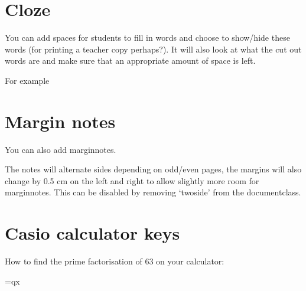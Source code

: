 \documentclass[11pt,a4paper,twoside]{report}
\begin{document}
\GridOn

\section{Cloze}

You can add spaces for students to fill in words and choose to show/hide these words (for printing a teacher copy perhaps?). It will also look at what the cut out words are and make sure that an appropriate amount of space is left.


For example 


\section{Margin notes}
You can also add marginnotes. 

The notes will alternate sides depending on odd/even pages, the margins will also change by 0.5 cm on the left and right to allow slightly more room for marginnotes. This can be disabled by removing `twoside' from the documentclass.

\section{Casio calculator keys}

How to find the prime factorisation of 63 on your calculator:
\begin{center}
    {=qx}
\end{center}
\end{document}
